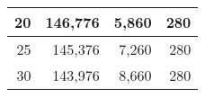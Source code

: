 \begin{table}[htbp]
\begin{center}
\begin{tabular}{rrrr}
      20 & 146,776 & 5,860 & 280 \\ \hline
      25 & 145,376 & 7,260 & 280 \\ \hline
      30 & 143,976 & 8,660 & 280 \\ \hline
    \end{tabular}
  \end{center}
\end{table}
